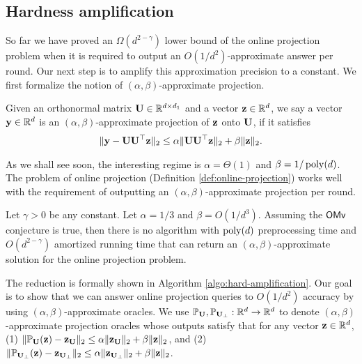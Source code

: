 \subsection{Hardness amplification}
\label{sec:hard-amplification}
So far we have proved an $\Omega(d^{2 - \gamma})$ lower bound of the online projection problem when it is required to output an $O(1/d^2)$-approximate answer per round. 
Our next step is to amplify this approximation precision to a constant.
We first formalize the notion of $(\alpha, \beta)$-approximate projection.

\begin{definition}
Given an orthonormal matrix $\mathbf{U} \in \mathbb{R}^{d\times d_1}$ and a vector $\mathbf{z} \in \mathbb{R}^{d}$, we say a vector $\mathbf{y}\in \mathbb{R}^{d}$ is an $(\alpha, \beta)$-approximate projection of $\mathbf{z}$ onto $\mathbf{U}$, if it satisfies 
\begin{align*}
\|\mathbf{y} - \mathbf{U}\mathbf{U}^{\top}\mathbf{z}\|_2 \leq \alpha \|\mathbf{U}\mathbf{U}^\top \mathbf{z}\|_2 + \beta\|\mathbf{z}\|_2.
\end{align*}
\end{definition}
As we shall see soon, the interesting regime is $\alpha = \Theta(1)$ and $\beta = 1/\operatorname{poly}(d)$. The problem of online projection (Definition \ref{def:online-projection}) works well with the requirement of outputting an $(\alpha, \beta)$-approximate projection per round. 

\begin{lemma}
\label{lem:hard-amplification}
Let $\gamma > 0$ be any constant. Let $\alpha = 1/3$ and $\beta = O(1/d^3)$.
Assuming the $\mathsf{OMv}$ conjecture is true, then there is no algorithm with $\operatorname{poly}(d)$ preprocessing time and $O(d^{2-\gamma})$ amortized running time that can return an $(\alpha, \beta)$-approximate solution for the online projection problem.
\end{lemma}



The reduction is formally shown in Algorithm \ref{algo:hard-amplification}. Our goal is to show that we can answer online projection queries to $O(1/d^2)$ accuracy by using $(\alpha, \beta)$-approximate oracles. We use $\mathbb{P}_{\mathbf{U}}, \mathbb{P}_{\mathbf{U}_\perp}: \mathbb{R}^d \to \mathbb{R}^d$ to denote $(\alpha, \beta)$-approximate projection oracles whose outputs satisfy that for any vector $\mathbf{z} \in \mathbb{R}^d$, 
(1) $\|\mathbb{P}_{\mathbf{U}}(\mathbf{z}) - \mathbf{z}_{\mathbf{U}}\|_2 \leq  \alpha \|\mathbf{z}_{\mathbf{U}}\|_2 + \beta \|\mathbf{z}\|_2$, and 
(2) $\|\mathbb{P}_{\mathbf{U}_\perp}(\mathbf{z}) - \mathbf{z}_{\mathbf{U}_\perp}\|_2 \leq  \alpha \|\mathbf{z}_{\mathbf{U}_\perp}\|_2 + \beta \|\mathbf{z}\|_2 $.

